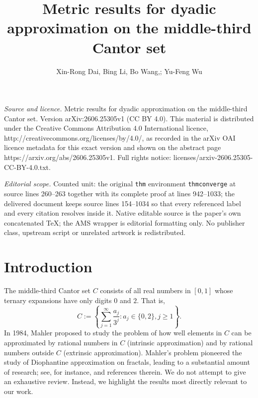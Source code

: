\documentclass[10pt,a4paper]{amsart}
\numberwithin{equation}{section} %
\begin{document}
\title[Metric results for dyadic approximation on the middle-third ]{Metric results for dyadic approximation on the middle-third Cantor set}
\author{Xin-Rong Dai, Bing Li, Bo Wang,; Yu-Feng Wu}
\date{}
\maketitle
\noindent\emph{Source and licence.} Metric results for dyadic approximation on the middle-third Cantor set. Version arXiv:2606.25305v1 (CC BY 4.0). This material is distributed under the Creative Commons Attribution 4.0 International licence, http://creativecommons.org/licenses/by/4.0/, as recorded in the arXiv OAI licence metadata for this exact version and shown on the abstract page https://arxiv.org/abs/2606.25305v1. Full rights notice: licenses/arxiv-2606.25305-CC-BY-4.0.txt.\par\smallskip
\noindent\textit{Editorial scope.} Counted unit: the original \texttt{thm} environment \texttt{thmconverge} at source lines 260--263 together with its complete proof at lines 942--1033; the delivered document keeps source lines 154--1034 so that every referenced label and every citation resolves inside it. Native editable source is the paper's own concatenated TeX; the AMS wrapper is editorial formatting only. No publisher class, upstream script or unrelated artwork is redistributed.
\section{Introduction}


 The middle-third Cantor set $C$ consists of all real numbers in $[0,1]$ whose ternary expansions  have only  digits $0$ and $2$. That is,
\begin{equation*}
	C:=\left\{\sum_{j=1}^{\infty}\frac{a_j}{3^j}: a_j\in \{0,2\}, j\geq 1\right\}.
\end{equation*}
In 1984,  Mahler \cite{Mahler84} proposed to study the problem of how well  elements in $C$ can  be
approximated by rational numbers in $C$ (intrinsic approximation) and by rational numbers outside  $C$ (extrinsic approximation). Mahler's problem pioneered the study of Diophantine approximation on fractals, leading to a substantial amount of research; see, for instance, \cite{LSV07O,BD16M,Schleischitz21,TWW24M,Baker25A,CVY24C,CU25S,BHZ24K} and references therein. We do not attempt to give an exhaustive review. Instead, we highlight the results most directly relevant to our work.
\end{document}
